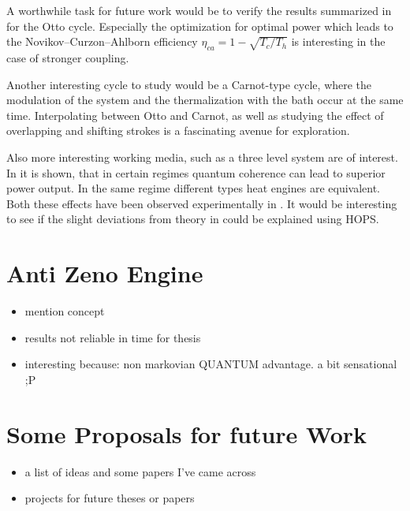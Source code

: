 A worthwhile task for future work would be to verify the results
summarized in \cite{Binder2018} for the Otto cycle. Especially the
optimization for optimal power which leads to the
Novikov–Curzon–Ahlborn efficiency \(η_{ca}=1-\sqrt{T_{c}/T_{h}}\) is
interesting in the case of stronger coupling.

Another interesting cycle to study would be a Carnot-type cycle, where
the modulation of the system and the thermalization with the bath
occur at the same time. Interpolating between Otto and Carnot, as well
as studying the effect of overlapping and shifting strokes is a
fascinating avenue for exploration.

Also more interesting working media, such as a three level system are
of interest. In \cite{Uzdin2015Sep} it is shown, that in certain
regimes quantum coherence can lead to superior power output. In the
same regime different types heat engines are equivalent. Both these
effects have been observed experimentally in \cite{Klatzow2019Mar}. It
would be interesting to see if the slight deviations from theory in
\cite{Klatzow2019Mar} could be explained using HOPS.


\newpage
\section{Anti Zeno Engine}
\label{sec:antizeno}
\begin{itemize}
\item mention concept
\item results not reliable in time for thesis
\item interesting because: non markovian QUANTUM advantage. a bit
  sensational ;P
\end{itemize}

\section{Some Proposals for future Work}
\begin{itemize}
\item a list of ideas and some papers I've came across
\item projects for future theses or papers
\end{itemize}


